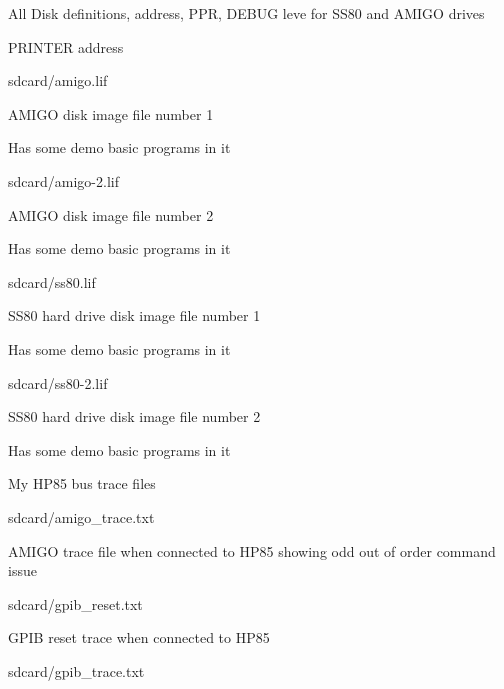 \begin{DoxyItemize}
\begin{DoxyItemize}
\begin{DoxyItemize}
\begin{DoxyItemize}
\item All Disk definitions, address, P\+PR, D\+E\+B\+UG leve for S\+S80 and A\+M\+I\+GO drives
\item P\+R\+I\+N\+T\+ER address
\end{DoxyItemize}
\item sdcard/amigo.\+lif
\begin{DoxyItemize}
\item A\+M\+I\+GO disk image file number 1
\item Has some demo basic programs in it
\end{DoxyItemize}
\item sdcard/amigo-\/2.\+lif
\begin{DoxyItemize}
\item A\+M\+I\+GO disk image file number 2
\item Has some demo basic programs in it
\end{DoxyItemize}
\item sdcard/ss80.\+lif
\begin{DoxyItemize}
\item S\+S80 hard drive disk image file number 1
\item Has some demo basic programs in it
\end{DoxyItemize}
\item sdcard/ss80-\/2.\+lif
\begin{DoxyItemize}
\item S\+S80 hard drive disk image file number 2
\item Has some demo basic programs in it
\end{DoxyItemize}
\end{DoxyItemize}
\item My H\+P85 bus trace files
\begin{DoxyItemize}
\item sdcard/amigo\+\_\+trace.\+txt
\begin{DoxyItemize}
\item A\+M\+I\+GO trace file when connected to H\+P85 showing odd out of order command issue
\end{DoxyItemize}
\item sdcard/gpib\+\_\+reset.\+txt
\begin{DoxyItemize}
\item G\+P\+IB reset trace when connected to H\+P85
\end{DoxyItemize}
\item sdcard/gpib\+\_\+trace.\+txt
\begin{DoxyItemize}

\end{DoxyItemize}
\end{DoxyItemize}
\end{DoxyItemize}
\end{DoxyItemize}
